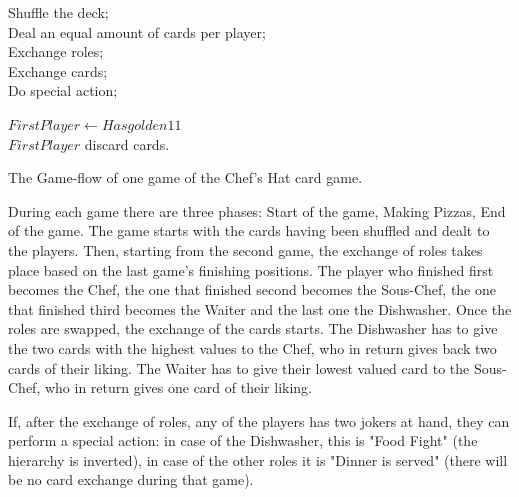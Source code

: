 \documentclass[a4paper,conference]{IEEEtran}
\begin{document}
\begin{algorithm}
 Shuffle the deck; \\
Deal an equal amount of cards per player; \\
  Exchange roles; \\
  Exchange cards; \\
  {
    Do special action;
  }
  
 \State $FirstPlayer\gets Has golden 11$\\
 $FirstPlayer$ discard cards. \\
 
 \caption{The Game-flow of one game of the Chef's Hat card game.}
 \label{alg:ChefsHat}
\end{algorithm}

During each game there are three phases: Start of the game, Making Pizzas, End of the game. The game starts with the cards having been shuffled and dealt to the players. Then, starting from the second game, the exchange of roles takes place based on the last game's  finishing positions. The player who finished first becomes the Chef, the one that finished second becomes the Sous-Chef, the one that finished third becomes the Waiter and the last one the Dishwasher. Once the roles are swapped, the exchange of the cards starts. The Dishwasher has to give the two cards with the highest values to the Chef, who in return gives back two cards of their liking. The Waiter has to give their lowest valued card to the Sous-Chef, who in return gives one card of their liking.

If, after the exchange of roles, any of the players has two jokers at hand, they can perform a special action: in case of the Dishwasher, this is "Food Fight" (the hierarchy is inverted), in case of the other roles it is "Dinner is served" (there will be no card exchange during that game).
\end{document}
